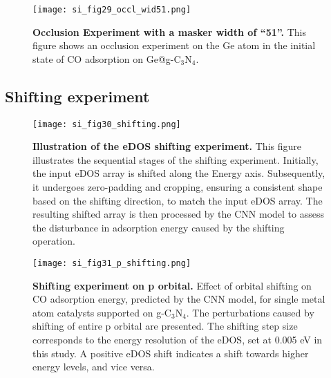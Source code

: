 \begin{figure}
  \centering
  \texttt{[image: si\_fig29\_occl\_wid51.png]}
  \caption{\textbf{Occlusion Experiment with a masker width of “51”.}
  This figure shows an occlusion experiment on the Ge atom in
  the initial state of CO adsorption on Ge@g-C$_3$N$_4$.}
  \label{si_fig29:occl_wid51}
\end{figure}


\subsection{Shifting experiment}


\begin{figure}
  \centering
  \texttt{[image: si\_fig30\_shifting.png]}
  \caption{\textbf{Illustration of the eDOS shifting experiment.}
  This figure illustrates the sequential stages of the shifting experiment.
  Initially, the input eDOS array is shifted along the Energy axis.
  Subsequently, it undergoes zero-padding and cropping,
  ensuring a consistent shape based on the shifting direction, to match the input eDOS array.
  The resulting shifted array is then processed by the CNN model to
  assess the disturbance in adsorption energy caused by the shifting operation.}
  \label{si_fig30:shifting}
\end{figure}


\begin{figure}
  \centering
  \texttt{[image: si\_fig31\_p\_shifting.png]}
  \caption{\textbf{Shifting experiment on p orbital.}
  Effect of orbital shifting on CO adsorption energy, predicted by the CNN model,
  for single metal atom catalysts supported on g-C$_3$N$_4$.
  The perturbations caused by shifting of entire p orbital are presented.
  The shifting step size corresponds to the energy resolution of the eDOS, set at 0.005 eV in this study.
  A positive eDOS shift indicates a shift towards higher energy levels, and vice versa.}
  \label{si_fig31:p_shifting}
\end{figure}
